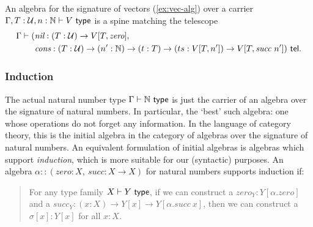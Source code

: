 \begin{example}[Vectors]\label{ex:vec-alg}
An algebra for the signature of vectors (\cref{ex:vec-alg}) over a carrier $\Gamma, T : \mathcal{U}, n : \mathbb{N} \vdash V \ \textsf{type}$ is a spine matching
the telescope
\begin{align*}
 \Gamma \vdash (&\textit{nil} : (T : \mathcal{U}) \to V[T, \textit{zero}], \\
&\textit{cons} : (T : \mathcal{U}) \to (n' : \mathbb{N}) \to (t : T) \to (ts : V[T,n']) \to V[T, \textit{succ}\ n']) \ \textsf{tel}.
\end{align*}
\end{example}

\subsubsection{Induction} The actual natural number type $\Gamma \vdash \mathbb{N} \ \textsf{type}$
is just the carrier of an algebra over the signature of natural numbers. In particular,
the `best' such algebra: one whose operations do not forget any information.
In the language of category theory, this is the initial algebra in the
category of algebras over the signature of natural numbers. An equivalent
formulation of initial algebras is algebras which support \emph{induction}, which is
more suitable for our (syntactic) purposes.
An algebra $\alpha :: (\textit{zero}: X,\ \textit{succ}: X \to X)$ for natural numbers supports induction if:

\begin{quote}
For any type family $X \vdash Y \ \textsf{type}$,
if we can construct a $\textit{zero}_Y : Y[\alpha.\textit{zero}]$ and a $\textit{succ}_Y : (x : X) \to Y[x] \to Y[\alpha.\textit{succ}\ x]$,
then we can construct a $\sigma[x] : Y[x]$ for all $x : X$.
\end{quote}

